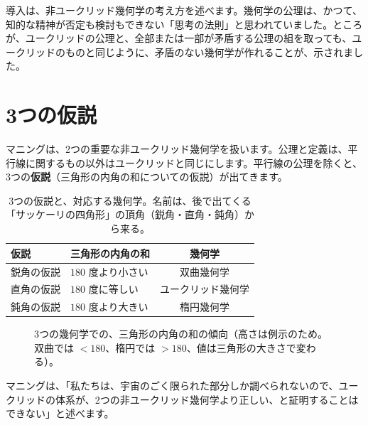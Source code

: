\documentclass[a4paper,11pt,openany]{ltjsbook}
\begin{document}
導入は、非ユークリッド幾何学の考え方を述べます。幾何学の公理は、かつて、知的な精神が否定も検討もできない「思考の法則」と思われていました。ところが、ユークリッドの公理と、全部または一部が矛盾する公理の組を取っても、ユークリッドのものと同じように、矛盾のない幾何学が作れることが、示されました。

\section{3つの仮説}

マニングは、2つの重要な非ユークリッド幾何学を扱います。公理と定義は、平行線に関するもの以外はユークリッドと同じにします。平行線の公理を除くと、3つの\textbf{仮説}（三角形の内角の和についての仮説）が出てきます。

\begin{table}[htbp]
\centering
\begin{tabular}{llc}
\toprule
仮説 & 三角形の内角の和 & 幾何学\\
\midrule
鋭角の仮説 & $180$ 度より小さい & 双曲幾何学\\
直角の仮説 & $180$ 度に等しい & ユークリッド幾何学\\
鈍角の仮説 & $180$ 度より大きい & 楕円幾何学\\
\bottomrule
\end{tabular}
\caption{3つの仮説と、対応する幾何学。名前は、後で出てくる「サッケーリの四角形」の頂角（鋭角・直角・鈍角）から来る。}
\end{table}

\begin{figure}[htbp]
\centering
{}
\caption{3つの幾何学での、三角形の内角の和の傾向（高さは例示のため。双曲では $<180$、楕円では $>180$、値は三角形の大きさで変わる）。}
\end{figure}

マニングは、「私たちは、宇宙のごく限られた部分しか調べられないので、ユークリッドの体系が、2つの非ユークリッド幾何学より正しい、と証明することはできない」と述べます。
\end{document}
